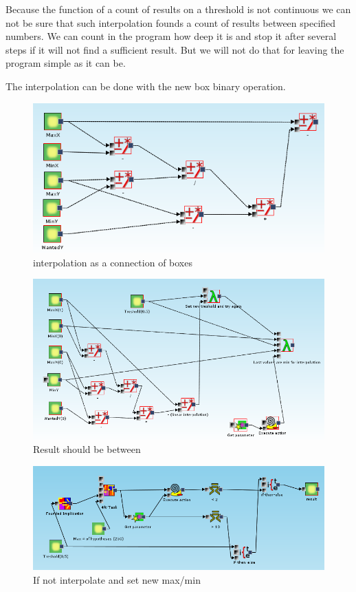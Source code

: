 \documentclass[a4paper,12pt]{book}
\begin{document}
Because the function of a count of results on a threshold is not continuous we can not be sure that such interpolation founds a count of results between specified numbers. We can count in the program how deep it is and stop it after several steps if it will not find a sufficient result. But we will not do that for leaving the program simple as it can be.

The interpolation can be done with the new box binary operation. 
\begin{figure}
	\includegraphics[width=13.72cm]{linearInterpolation}
	\caption{interpolation as a connection of boxes}
\end{figure}

\begin{figure}
	\includegraphics[width=13.72cm]{exampleMainRecursionPart}
	\caption{Result should be between}
\end{figure}

\begin{figure}
	\includegraphics[width=13.72cm]{exampleMainMiningPart}
	\caption{If not interpolate and set new max/min}
\end{figure}
\end{document}
